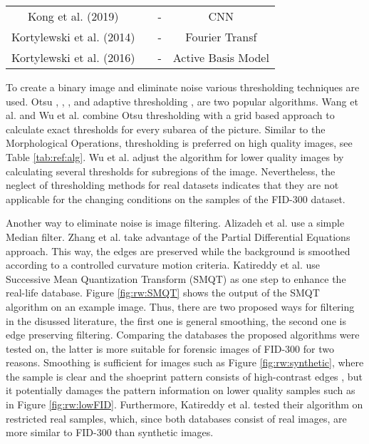 \documentclass[draft,final]{vutinfth} %
\begin{document}
\begin{sidewaystable}
\begin{minipage}{\linewidth}
\begin{tabular}{c|c|c|c}
Kong et al. (2019) \cite{kong2019cross} & & - & CNN \\
Kortylewski et al. (2014) \cite{kortylewski2014unsupervised} & & - & Fourier Transf \\
Kortylewski et al. (2016) \cite{kortylewski2016probabilistic} & & - & Active Basis Model \\
\end{tabular}
\label{tab:ref:alg} 
\end{minipage}
\end{sidewaystable}

\par
To create a binary image and eliminate noise various thresholding techniques are used.
Otsu  \cite{wu2019crime}, \cite{algarni2008novel}, \cite{alizadeh2017automatic}, \cite{kong2014novel} and adaptive thresholding \cite{wang2014automatic}, \cite{li2014retrieval} are two popular algorithms.
Wang et al. \cite{wang2014automatic} and Wu et al. \cite{wu2019crime} combine Otsu thresholding with a grid based approach to calculate exact thresholds for every subarea of the picture.
Similar to the Morphological Operations, thresholding is preferred on high quality images, see Table \ref{tab:ref:alg}.
Wu et al. \cite{wu2019crime} adjust the algorithm for lower quality images by calculating several thresholds for subregions of the image.
Nevertheless, the neglect of thresholding methods for real datasets indicates that they are not applicable for the changing conditions on the samples of the FID-300 dataset.
     
\par
Another way to eliminate noise is image filtering.
Alizadeh et al. \cite{alizadeh2017automatic} use a simple Median filter.
Zhang et al. \cite{zhang2005automatic} take advantage of the Partial Differential Equations approach.
This way, the edges are preserved while the background is smoothed according to a controlled curvature motion criteria. 
Katireddy et al. \cite{katireddy2017novel} use Successive Mean Quantization Transform (SMQT) \cite{nilsson2013smqt} as one step to enhance the real-life database.
Figure \ref{fig:rw:SMQT} shows the output of the SMQT algorithm on an example image.
Thus, there are two proposed ways for filtering in the disussed literature, the first one is general smoothing, the second one is edge preserving filtering.
Comparing the databases the proposed algorithms were tested on, the latter is more suitable for forensic images of FID-300 for two reasons. 
Smoothing is sufficient for images such as Figure \ref{fig:rw:synthetic}, where the sample is clear and the shoeprint pattern consists of high-contrast edges \cite{alizadeh2017automatic}, but it potentially damages the pattern information on lower quality samples such as in Figure \ref{fig:rw:lowFID}.
Furthermore, Katireddy et al. \cite{katireddy2017novel} tested their algorithm on restricted real samples, which, since both databases consist of real images, are more similar to FID-300 than synthetic images. 
\end{document}
